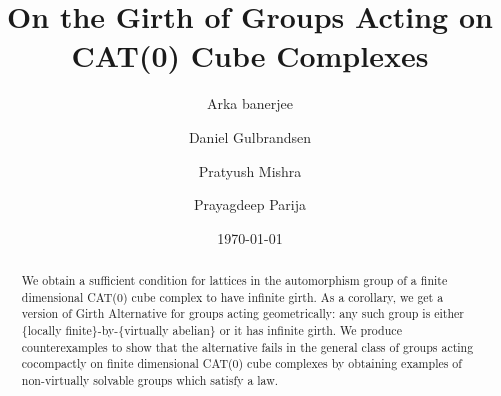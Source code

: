 \documentclass{amsart}
\date{\today}
\theoremstyle{definition}
\newtheorem*{Notation warning}{Warning on notations}
\newtheorem*{Sketch of proof}{Sketch of proof for Theorem C}
\begin{document}
\title[On the Girth of Groups Acting on CAT(0) Cube Complexes]{On the Girth of Groups Acting on CAT(0) Cube Complexes}
\author[A. banerjee]{Arka banerjee}
\address{Auburn University, 221 Parker Hall, Auburn, AL 36849, USA}
\author[D. Gulbrandsen]{Daniel Gulbrandsen}
\address{Adams State University, 208 Edgemont Blvd, Alamosa, CO 81101, USA}
\author[P. Mishra]{Pratyush Mishra}
\address{Wake Forest University, 127 Manchester Hall, Winston-Salem, NC 27109, USA}
\author[P. Parija]{Prayagdeep Parija}
\address{Virginia Tech, Mcbryde Hall, 225 Stranger Street, Blacksburg, VA 24060, USA }


\begin{abstract}
 We obtain a sufficient condition for lattices in the automorphism group of a finite dimensional CAT(0) cube complex to have infinite girth. As a corollary, we get a version of Girth Alternative for groups acting geometrically: any such group is either \{locally finite\}-by-\{virtually abelian\} or it has infinite girth. We produce counterexamples to show that the alternative fails in the general class of groups acting cocompactly on finite dimensional CAT(0) cube complexes by obtaining examples of non-virtually solvable groups which satisfy a law.
\end{abstract}
\end{document}
